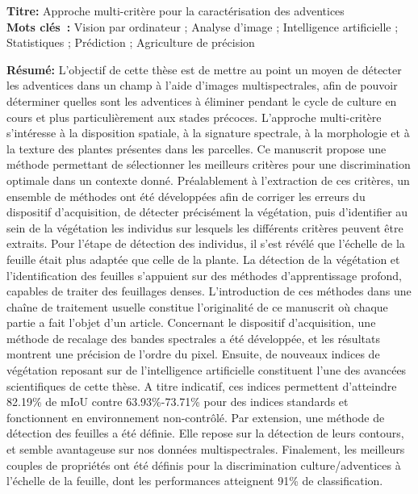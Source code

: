 \documentclass[12pt, a4paper, twoside]{scrbook}
\begin{document}
	\begin{framed}
		\noindent \textbf{Titre:} Approche multi-critère pour la caractérisation des adventices \\[1em]
		\noindent \textbf{Mots clés :}  Vision par ordinateur ; Analyse d'image ; Intelligence artificielle ; Statistiques ; Prédiction ; Agriculture de précision
		\begin{multicols}{2}
			\noindent \textbf{Résumé:} L'objectif de cette thèse est de mettre au point un moyen de détecter les adventices dans un champ à l'aide d'images multispectrales, afin de pouvoir déterminer quelles sont les adventices à éliminer pendant le cycle de culture en cours et plus particulièrement aux stades précoces. L'approche multi-critère s'intéresse à la disposition spatiale, à la signature spectrale, à la morphologie et à la texture des plantes présentes dans les parcelles. Ce manuscrit propose une méthode permettant de sélectionner les meilleurs critères pour une discrimination optimale dans un contexte donné. Préalablement à l'extraction de ces critères, un ensemble de méthodes ont été développées afin de corriger les erreurs du dispositif d'acquisition, de détecter précisément la végétation, puis d'identifier au sein de la végétation les individus sur lesquels les différents critères peuvent être extraits. Pour l'étape de détection des individus, il s'est révélé que l'échelle de la feuille était plus adaptée que celle de la plante. La détection de la végétation et l'identification des feuilles s'appuient sur des méthodes d'apprentissage profond, capables de traiter des feuillages denses. L'introduction de ces méthodes dans une chaîne de traitement usuelle constitue l'originalité de ce manuscrit où chaque partie a fait l'objet d'un article. Concernant le dispositif d'acquisition, une méthode de recalage des bandes spectrales a été développée, et les résultats montrent une précision de l'ordre du pixel. Ensuite, de nouveaux indices de végétation reposant sur de l'intelligence artificielle constituent l'une des avancées scientifiques de cette thèse. A titre indicatif, ces indices permettent d'atteindre 82.19\% de mIoU contre 63.93\%-73.71\% pour des indices standards et fonctionnent en environnement non-contrôlé. Par extension, une méthode de détection des feuilles a été définie. Elle repose sur la détection de leurs contours, et semble avantageuse sur nos données multispectrales. Finalement, les meilleurs couples de propriétés ont été définis pour la discrimination culture/adventices à l'échelle de la feuille, dont les performances atteignent 91\% de classification.
		\end{multicols}
	\end{framed}
\end{document}

